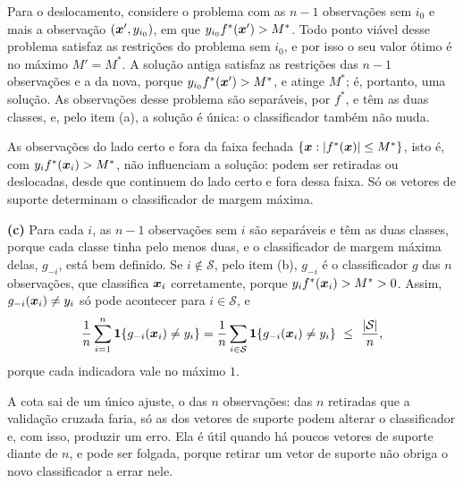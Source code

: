 \begin{solucao}
Para o deslocamento, considere o problema com as $n-1$ observações sem $i_0$ e mais a
observação $(\bm{x}',y_{i_0})$, em que $y_{i_0}f^*(\bm{x}')>M^*$. Todo ponto viável desse problema
satisfaz as restrições do problema sem $i_0$, e por isso o seu valor ótimo é no máximo
$M'=M^*$. A solução antiga satisfaz as restrições das $n-1$ observações e a da nova, porque
$y_{i_0}f^*(\bm{x}')>M^*$, e atinge $M^*$; é, portanto, uma solução. As observações desse problema
são separáveis, por $f^*$, e têm as duas classes, e, pelo item (a), a solução é única: o
classificador também não muda.

As observações do lado certo e fora da faixa fechada $\{\bm{x}:\left\lvert f^*(\bm{x}) \right\rvert\le M^*\}$, isto é,
com $y_if^*(\bm{x}_i)>M^*$, não influenciam a solução: podem ser retiradas ou deslocadas, desde que
continuem do lado certo e fora dessa faixa. Só os vetores de suporte determinam o classificador
de margem máxima.

\smallskip
\textbf{(c)} Para cada $i$, as $n-1$ observações sem $i$ são separáveis e têm as duas classes,
porque cada classe tinha pelo menos duas, e o classificador de margem máxima delas, $g_{-i}$,
está bem definido. Se $i\notin\mathcal S$, pelo item (b), $g_{-i}$ é o classificador $g$ das $n$
observações, que classifica $\bm{x}_i$ corretamente, porque $y_if^*(\bm{x}_i)>M^*>0$. Assim,
$g_{-i}(\bm{x}_i)\ne y_i$ só pode acontecer para $i\in\mathcal S$, e
\[
  \frac1n\sum_{i=1}^n\1{g_{-i}(\x_i)\ne y_i}
  =\frac1n\sum_{i\in\mathcal S}\1{g_{-i}(\x_i)\ne y_i}\ \le\ \frac{\abs{\mathcal S}}{n},
\]
porque cada indicadora vale no máximo $1$.

A cota sai de um único ajuste, o das $n$ observações: das $n$ retiradas que a validação cruzada
faria, só as dos vetores de suporte podem alterar o classificador e, com isso, produzir um erro.
Ela é útil quando há poucos vetores de suporte diante de $n$, e pode ser folgada, porque retirar
um vetor de suporte não obriga o novo classificador a errar nele.
\end{solucao}
